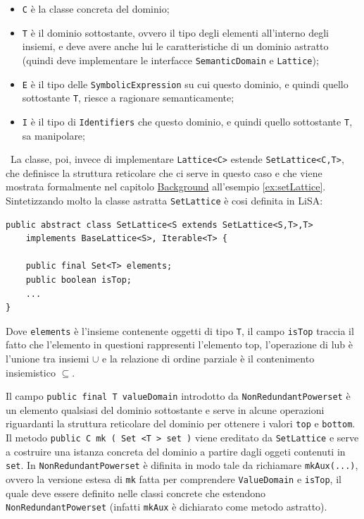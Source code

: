 \begin{itemize}
    \itemsep0pt
    \item \texttt{C} è la classe concreta del dominio;
    \item \texttt{T} è il dominio sottostante, ovvero il tipo degli elementi all'interno degli insiemi, e deve avere anche lui le caratteristiche di un dominio astratto (quindi deve implementare le interfacce \texttt{SemanticDomain} e \texttt{Lattice});
    \item \texttt{E} è il tipo delle \texttt{SymbolicExpression} su cui questo dominio, e quindi quello sottostante \texttt{T}, riesce a ragionare semanticamente;
    \item \texttt{I} è il tipo di \texttt{Identifiers} che questo dominio,  e quindi quello sottostante \texttt{T}, sa manipolare;
\end{itemize}\ 
La classe, poi, invece di implementare \texttt{Lattice<C>} estende \texttt{SetLattice<C,T>}, che definisce la struttura reticolare che ci serve in questo caso e che viene mostrata formalmente nel capitolo \hyperref[chapter:background]{Background} all'esempio \ref{ex:setLattice}. Sintetizzando molto la classe astratta \texttt{SetLattice} è cosi definita in LiSA:
\begin{lstlisting}[belowskip=-1.1 \baselineskip]
public abstract class SetLattice<S extends SetLattice<S,T>,T> 
    implements BaseLattice<S>, Iterable<T> {

    public final Set<T> elements;
    public boolean isTop;
    ...
}
\end{lstlisting}
Dove \texttt{elements} è l'insieme contenente oggetti di tipo \texttt{T}, il campo \texttt{isTop} traccia il fatto che l'elemento in questioni rappresenti l'elemento top, l'operazione di lub è l'unione tra insiemi \(\cup\) e la relazione di ordine parziale è il contenimento insiemistico \(\subseteq\).

Il campo \texttt{public final T valueDomain} introdotto da \texttt{NonRedundantPowerset} è un elemento qualsiasi del dominio sottostante e serve in alcune operazioni riguardanti la struttura reticolare del dominio per ottenere i valori \texttt{top} e \texttt{bottom}. Il metodo \texttt{public C mk ( Set <T > set )} viene ereditato da \texttt{SetLattice} e serve a costruire una istanza concreta del dominio a partire dagli oggeti contenuti in \texttt{set}. In \texttt{NonRedundantPowerset} è difinita in modo tale da richiamare \texttt{mkAux(...)}, ovvero la versione estesa di \texttt{mk} fatta per comprendere \texttt{ValueDomain} e \texttt{isTop}, il quale deve essere definito nelle classi concrete che estendono \texttt{NonRedundantPowerset} (infatti \texttt{mkAux} è dichiarato come metodo astratto).

